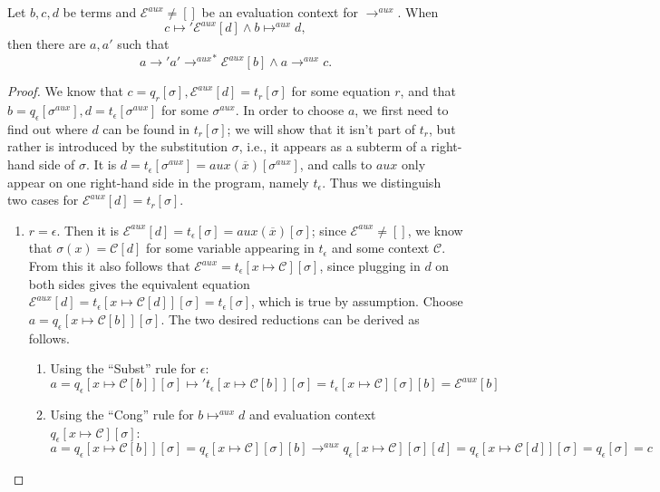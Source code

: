\begin{lemma}
\label{lem:appinv1}
Let $b,c,d$ be terms and $\mathcal{E}^{aux} \neq []$ be an evaluation context for $\longrightarrow^{aux}$. When
\[
c \mapsto' \mathcal{E}^{aux}[d] \land b \mapsto^{aux} d,
\]
then there are $a, a'$ such that
\[
a \longrightarrow' a' {\longrightarrow^{aux}}^* \mathcal{E}^{aux}[b] \land a \longrightarrow^{aux} c.
\]
\begin{proof}
We know that $c = q_r[\sigma], \mathcal{E}^{aux}[d] = t_r[\sigma]$ for some equation $r$, and that $b = q_\epsilon[\sigma^{aux}], d = t_\epsilon[\sigma^{aux}]$ for some $\sigma^{aux}$.
In order to choose $a$, we first need to find out where $d$ can be found in $t_r[\sigma]$; we will show that it isn't part of $t_r$, but rather is introduced by the substitution $\sigma$, i.e., it appears as a subterm of a right-hand side of $\sigma$. It is $d = t_\epsilon[\sigma^{aux}] = aux(\overline{x})[\sigma^{aux}]$, and calls to $aux$ only appear on one right-hand side in the program, namely $t_\epsilon$. Thus we distinguish two cases for $\mathcal{E}^{aux}[d] = t_r[\sigma]$.
\begin{enumerate}
\item $r = \epsilon$. Then it is $\mathcal{E}^{aux}[d] = t_\epsilon[\sigma] = aux(\overline{x})[\sigma]$; since $\mathcal{E}^{aux} \neq []$, we know that $\sigma(x) = \mathcal{C}[d]$ for some variable appearing in $t_\epsilon$ and some context $\mathcal{C}$. From this it also follows that $\mathcal{E}^{aux} = t_\epsilon[x \mapsto \mathcal{C}][\sigma]$, since plugging in $d$ on both sides gives the equivalent equation $\mathcal{E}^{aux}[d] = t_\epsilon[x \mapsto \mathcal{C}[d]][\sigma] = t_\epsilon[\sigma]$, which is true by assumption. Choose $a = q_\epsilon[x \mapsto \mathcal{C}[b]][\sigma]$. The two desired reductions can be derived as follows.
\begin{enumerate}
\item Using the ``Subst'' rule for $\epsilon$:
\[
a = q_\epsilon[x \mapsto \mathcal{C}[b]][\sigma] \mapsto' t_\epsilon[x \mapsto \mathcal{C}[b]][\sigma] = t_\epsilon[x \mapsto \mathcal{C}][\sigma][b] = \mathcal{E}^{aux}[b]
\]

\item Using the ``Cong'' rule for $b \mapsto^{aux} d$ and evaluation context $ q_\epsilon[x \mapsto \mathcal{C}][\sigma]$:
\[
a = q_\epsilon[x \mapsto \mathcal{C}[b]][\sigma] = q_\epsilon[x \mapsto \mathcal{C}][\sigma][b] \longrightarrow^{aux} q_\epsilon[x \mapsto \mathcal{C}][\sigma][d] = q_\epsilon[x \mapsto \mathcal{C}[d]][\sigma] = q_\epsilon[\sigma] = c
\]
\end{enumerate}


\end{enumerate}
\end{proof}
\end{lemma}
